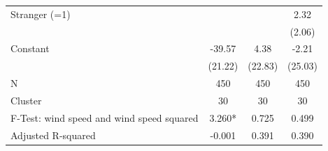 {\begin{tabular}{l*{3}{c}}
Stranger (=1)       &                     &                     &        2.32         \\
                    &                     &                     &      (2.06)         \\
Constant            &      -39.57\sym{*}  &        4.38         &       -2.21         \\
                    &     (21.22)         &     (22.83)         &     (25.03)         \\
\midrule
N                   &         450         &         450         &         450         \\
Cluster             &          30         &          30         &          30         \\
F-Test: wind speed and wind speed squared&      3.260*         &       0.725         &       0.499         \\
Adjusted R-squared  &      -0.001         &       0.391         &       0.390         \\
\bottomrule
\end{tabular}
}

